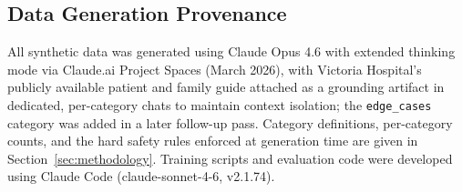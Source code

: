 \documentclass[AMA,Times1COL]{WileyNJDv5} %
\begin{document}
\subsection{Data Generation Provenance}

All synthetic data was generated using Claude Opus 4.6 with extended thinking mode via Claude.ai Project Spaces (March 2026), with Victoria Hospital's publicly available patient and family guide attached as a grounding artifact in dedicated, per-category chats to maintain context isolation; the \texttt{edge\_cases} category was added in a later follow-up pass. Category definitions, per-category counts, and the hard safety rules enforced at generation time are given in Section~\ref{sec:methodology}. Training scripts and evaluation code were developed using Claude Code (claude-sonnet-4-6, v2.1.74).

\nocite{*}%
\end{document}
